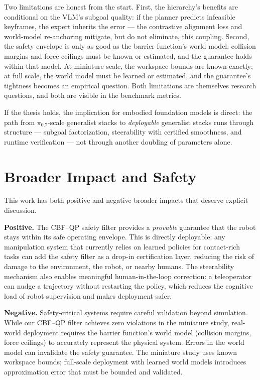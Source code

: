 \documentclass[11pt,a4paper]{article}
\begin{document}
Two limitations are honest from the start. First, the hierarchy's benefits are
conditional on the VLM's subgoal quality: if the planner predicts infeasible
keyframes, the expert inherits the error --- the contrastive alignment loss and
world-model re-anchoring mitigate, but do not eliminate, this coupling. Second,
the safety envelope is only as good as the barrier function's world model:
collision margins and force ceilings must be known or estimated, and the
guarantee holds within that model. At miniature scale, the workspace bounds are
known exactly; at full scale, the world model must be learned or estimated, and
the guarantee's tightness becomes an empirical question. Both limitations are
themselves research questions, and both are visible in the benchmark metrics.

If the thesis holds, the implication for embodied foundation models is direct:
the path from $\pi_0.7$-scale generalist stacks to \emph{deployable} generalist
stacks runs through structure --- subgoal factorization, steerability with
certified smoothness, and runtime verification --- not through another doubling
of parameters alone.

\section{Broader Impact and Safety}
\label{sec:broader}

This work has both positive and negative broader impacts that deserve explicit
discussion.

\textbf{Positive.} The CBF--QP safety filter provides a \emph{provable}
guarantee that the robot stays within its safe operating envelope. This is
directly deployable: any manipulation system that currently relies on learned
policies for contact-rich tasks can add the safety filter as a drop-in
certification layer, reducing the risk of damage to the environment, the
robot, or nearby humans. The steerability mechanism also enables meaningful
human-in-the-loop correction: a teleoperator can nudge a trajectory without
restarting the policy, which reduces the cognitive load of robot supervision and
makes deployment safer.

\textbf{Negative.} Safety-critical systems require careful validation beyond
simulation. While our CBF--QP filter achieves zero violations in the miniature
study, real-world deployment requires the barrier function's world model
(collision margins, force ceilings) to accurately represent the physical system.
Errors in the world model can invalidate the safety guarantee. The miniature
study uses known workspace bounds; full-scale deployment with learned world
models introduces approximation error that must be bounded and validated.
\end{document}
